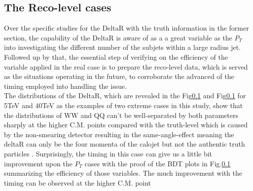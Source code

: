 \subsection{The Reco-level cases}
Over the specific studies for the DeltaR with the truth information in the former section, the capability of the DeltaR is aware of as a a great variable as the $P_{T}$ into investigating the different number of the subjets within a large radius jet. Followed up by that, the essential step of verifying on the efficiency of the variable applied in the real case is to prepare the reco-level data, which is served as the situations operating in the future, to corroborate the advanced of the timing employed into handling the issue.\\ 

The distributions of the DeltaR, which are revealed in the Fig\ref{} and Fig\ref{} for 5TeV and 40TeV as the examples of two extreme cases in this study, show that the distributions of WW and QQ can't be well-separated by both parameters sharply at the higher C.M. points compared with the truth-level which is caused by the non-smearing detector resulting in the same-angle-effect meaning the deltaR can only be the four momenta of the calojet but not the authentic truth particles . Surprisingly, the timing in this case can give us a little bit improvement upon the $P_{T}$ cases with the proof of the BDT plots in Fig.\ref{} summarizing the efficiency of those variables. The much improvement with the timing can be observed at the higher C.M. point\\








